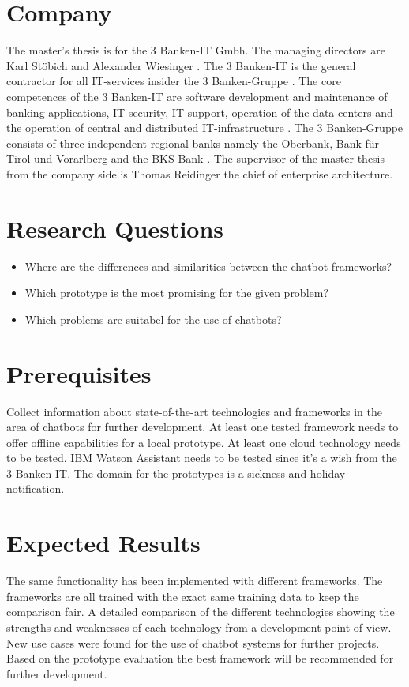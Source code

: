 \section{Company}
The master's thesis is for the 3 Banken-IT Gmbh. The managing directors are Karl St\"obich and Alexander Wiesinger \cite{3bitorgani}. 
The 3 Banken-IT is the general contractor for all IT-services insider the 3 Banken-Gruppe \cite{3bitservices}. 
The core competences of the 3 Banken-IT are software development and maintenance of banking applications, IT-security, 
IT-support, operation of the data-centers and the operation of central and distributed IT-infrastructure \cite{3bitservices}. 
The 3 Banken-Gruppe consists of three independent regional banks namely the Oberbank, Bank für Tirol und Vorarlberg and the BKS Bank \cite{3bitcompany}. 
The supervisor of the master thesis from the company side is Thomas Reidinger the chief of enterprise architecture.

\section{Research Questions}
\begin{itemize}
    \item Where are the differences and similarities between the chatbot frameworks?
    \item Which prototype is the most promising for the given problem?
    \item Which problems are suitabel for the use of chatbots?
\end{itemize}

\section{Prerequisites} \label{sec:prereq}
Collect information about state-of-the-art technologies and frameworks in the area of chatbots for further development.
At least one tested framework needs to offer offline capabilities for a local prototype.
At least one cloud technology needs to be tested.
IBM Watson Assistant needs to be tested since it's a wish from the 3 Banken-IT.
The domain for the prototypes is a sickness and holiday notification.


\section{Expected Results}
The same functionality has been implemented with different frameworks.
The frameworks are all trained with the exact same training data to keep the comparison fair.
A detailed comparison of the different technologies showing the strengths and weaknesses of each technology from a development point of view.
New use cases were found for the use of chatbot systems for further projects.
Based on the prototype evaluation the best framework will be recommended for further development.